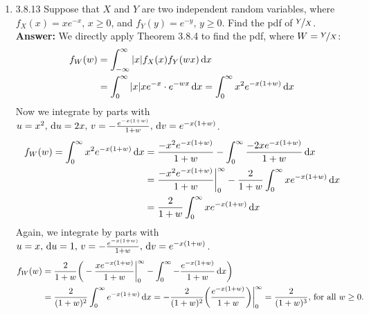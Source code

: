 \documentclass{article}
\begin{document}
\begin{enumerate}
        \item 3.8.13 Suppose that $X$ and $Y$ are two independent random variables, where $f_X(x) = xe^{-x}, \, x \geq 0$, and $f_Y(y) = e^{-y}, \, y\geq 0$. Find the pdf of $\nicefrac{Y}{X}$.\\
        \textbf{Answer: } We directly apply Theorem 3.8.4 to find the pdf, where $W=\nicefrac{Y}{X}$:
            \begin{align*}
                f_W(w) &= \int_{-\infty}^\infty |x|f_X(x)f_Y(wx) \dif x\\
                &= \int_0^\infty |x|xe^{-x}\cdot e^{-wx} \dif x = \int_0^\infty x^2e^{-x(1+w)} \dif x
            \end{align*}
        Now we integrate by parts with $u=x^2, \, \dif u=2x, \, v=-\frac{e^{-x(1+w)}}{1+w}, \, \dif v=e^{-x(1+w)}$.
            \begin{align*}
                f_W(w) = \int_0^\infty x^2e^{-x(1+w)} \dif x &= \frac{-x^2e^{-x(1+w)}}{1+w} - \int_0^\infty \frac{-2xe^{-x(1+w)}}{1+w} \dif x\\
                &= \frac{-x^2e^{-x(1+w)}}{1+w}\bigg|_0^\infty -\frac{2}{1+w} \int_0^\infty xe^{-x(1+w)} \dif x\\
                &= \frac{2}{1+w} \int_0^\infty xe^{-x(1+w)} \dif x
            \end{align*}
        Again, we integrate by parts with $u=x, \, \dif u=1, \, v= -\frac{e^{-x(1+w)}}{1+w}, \, \dif v=e^{-x(1+w)}$.
            \begin{align*}
                f_W(w) &= \frac{2}{1+w}\bigg(-\frac{xe^{-x(1+w)}}{1+w}\bigg|_0^\infty-\int_0^\infty  -\frac{e^{-x(1+w)}}{1+w} \dif x\bigg)\\
                &= \frac{2}{(1+w)^2} \int_0^\infty e^{-x(1+w)} \dif x = -\frac{2}{(1+w)^2}\bigg(\frac{e^{-x(1+w)}}{1+w}\bigg)\bigg|_0^\infty = \frac{2}{(1+w)^3}, \, \text{for all }w \geq 0.
            \end{align*}
    \end{enumerate}
    
\end{document}

